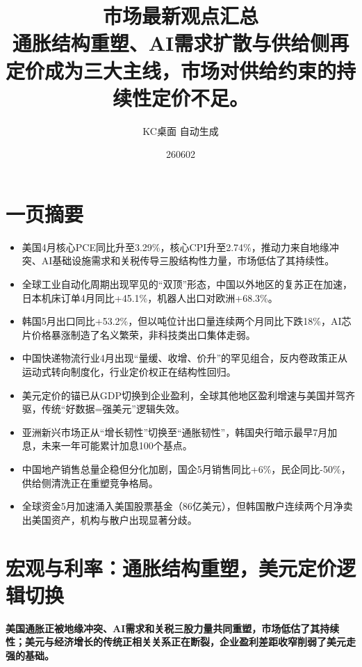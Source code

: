 \documentclass[11pt]{ctexart}
\title{\textbf{市场最新观点汇总}\\[0.4em]{\large 通胀结构重塑、AI需求扩散与供给侧再定价成为三大主线，市场对供给约束的持续性定价不足。}}
\author{KC桌面 自动生成}
\date{260602}
\begin{document}
\maketitle
\tableofcontents
\newpage
\section{一页摘要}
\begin{itemize}
  \item 美国4月核心PCE同比升至3.29\%，核心CPI升至2.74\%，推动力来自地缘冲突、AI基础设施需求和关税传导三股结构性力量，市场低估了其持续性。
  \item 全球工业自动化周期出现罕见的“双顶”形态，中国以外地区的复苏正在加速，日本机床订单4月同比+45.1\%，机器人出口对欧洲+68.3\%。
  \item 韩国5月出口同比+53.2\%，但以吨位计出口量连续两个月同比下跌18\%，AI芯片价格暴涨制造了名义繁荣，非科技类出口集体走弱。
  \item 中国快递物流行业4月出现“量缓、收增、价升”的罕见组合，反内卷政策正从运动式转向制度化，行业定价权正在结构性回归。
  \item 美元定价的锚已从GDP切换到企业盈利，全球其他地区盈利增速与美国并驾齐驱，传统“好数据=强美元”逻辑失效。
  \item 亚洲新兴市场正从“增长韧性”切换至“通胀韧性”，韩国央行暗示最早7月加息，未来一年可能累计加息100个基点。
  \item 中国地产销售总量企稳但分化加剧，国企5月销售同比+6\%，民企同比-50\%，供给侧清洗正在重塑竞争格局。
  \item 全球资金5月加速涌入美国股票基金（86亿美元），但韩国散户连续两个月净卖出美国资产，机构与散户出现显著分歧。
\end{itemize}
\section{宏观与利率：通胀结构重塑，美元定价逻辑切换}
\textbf{美国通胀正被地缘冲突、AI需求和关税三股力量共同重塑，市场低估了其持续性；美元与经济增长的传统正相关关系正在断裂，企业盈利差距收窄削弱了美元走强的基础。}
\end{document}
